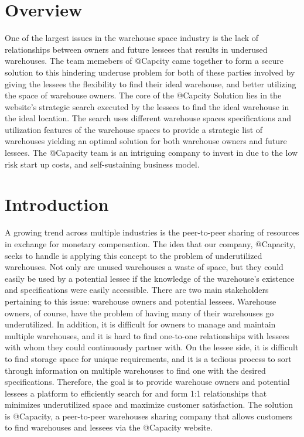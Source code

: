 \section{Overview}
One of the largest issues in the warehouse space industry is the lack of relationships between owners and future lessees that results in underused warehouses. The team memebers of @Capcity came together to form a secure solution to this hindering underuse problem for both of these parties involved by giving the lessees the flexibility to find their ideal warehouse, and better utilizing the space of warehouse owners. The core of the @Capcity Solution lies in the website's strategic search executed by the lessees to find the ideal warehouse in the ideal location. The search uses different warehouse spaces specifications and utilization features of the warehouse spaces to provide a strategic list of warehouses yielding an optimal solution for both warehouse owners and future lessees. The @Capacity team is an intriguing company to invest in due to the low risk start up costs, and self-sustaining business model. 

\section{Introduction}
A growing trend across multiple industries is the peer-to-peer sharing of resources in exchange for monetary compensation. The idea that our company, @Capacity, seeks to handle is applying this concept to the problem of underutilized warehouses. Not only are unused warehouses a waste of space, but they could easily be used by a potential lessee if the knowledge of the warehouse's existence and specifications were easily accessible. There are two main stakeholders pertaining to this issue: warehouse owners and potential lessees. Warehouse owners, of course, have the problem of having many of their warehouses go underutilized. In addition, it is difficult for owners to manage and maintain multiple warehouses, and it is hard to find one-to-one relationships with lessees with whom they could continuously partner with. On the lessee side, it is difficult to find storage space for unique requirements, and it is a tedious process to sort through information on multiple warehouses to find one with the desired specifications. Therefore, the goal is to provide warehouse owners and potential lessees a platform to efficiently search for and form 1:1 relationships that minimizes underutilized space and maximize customer satisfaction. The solution is @Capacity, a peer-to-peer warehouses sharing company that allows customers to find warehouses and lessees via the @Capacity website.

